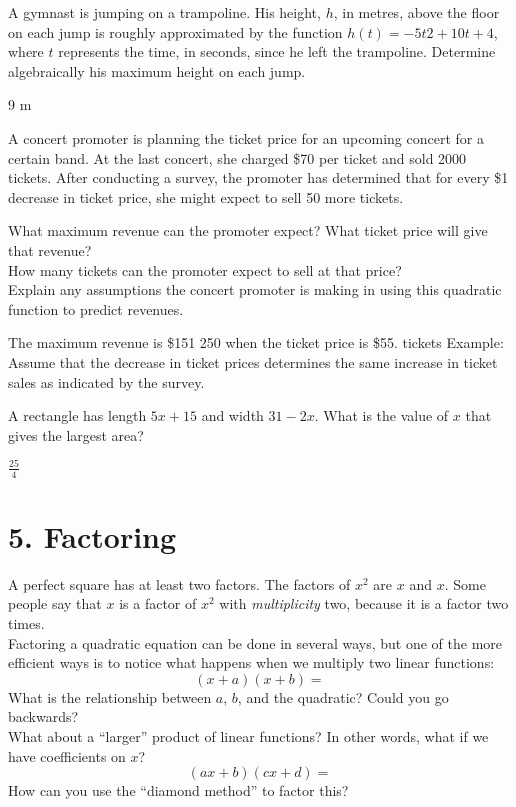 \documentclass[12pt,fleqn]{book}
\newcommand{\prb}[1]{\begin{Exercise}#1\end{Exercise}}
\newcommand{\sol}[1]{\begin{Answer}#1\end{Answer}}
\begin{document}
\prb{A gymnast is jumping on a trampoline.
	His height, $h$, in metres, above the floor
	on each jump is roughly approximated
	by the function $h(t) = -5t2 + 10t + 4$,
	where $t$ represents the time, in seconds,
	since he left the trampoline. Determine
	algebraically his maximum height on
	each jump.\\[2in]}
\sol{9 m}

\prb{A concert promoter is planning the ticket
	price for an upcoming concert for a certain
	band. At the last concert, she charged
	\$70 per ticket and sold 2000 tickets. After
	conducting a survey, the promoter has
	determined that for every \$1 decrease
	in ticket price, she might expect to sell
	50 more tickets.
	\begin{tasks}
		\task What maximum revenue can the
		promoter expect? What ticket price
		will give that revenue?\\[1in]
		\task How many tickets can the promoter
		expect to sell at that price?\\[1in]
		\task Explain any assumptions the concert
		promoter is making in using this
		quadratic function to predict revenues.\\[1in]
	\end{tasks}
}
\sol{
	\begin{tasks}
		\task The maximum revenue is \$151 250 when the ticket price is \$55.
		\task 2750 tickets
		\task Example: Assume that the decrease in ticket prices determines the same increase in ticket sales as indicated by the survey.
	\end{tasks}
}

\prb{A rectangle has length $5x+15$ and width $31-2x$.  What is the value of $x$ that gives the largest area?}
\sol{$\frac{25}{4}$}










\chapter{5. Factoring}
A perfect square has at least two factors.  The factors of $x^2$ are $x$ and $x$.  Some people say that $x$ is a factor of $x^2$ with \emph{multiplicity} two, because it is a factor two times.
\\[1em]
Factoring a quadratic equation can be done in several ways, but one of the more efficient ways is to notice what happens when we multiply two linear functions:
\[
    (x+a)(x+b) =
\]
What is the relationship between $a$, $b$, and the quadratic?  Could you go backwards?
\\[1in]
What about a ``larger'' product of linear functions?  In other words, what if we have coefficients on $x$?
\[ 
    (ax+b)(cx+d) = 
\]
How can you use the ``diamond method'' to factor this?
\\[2in]
\end{document}
